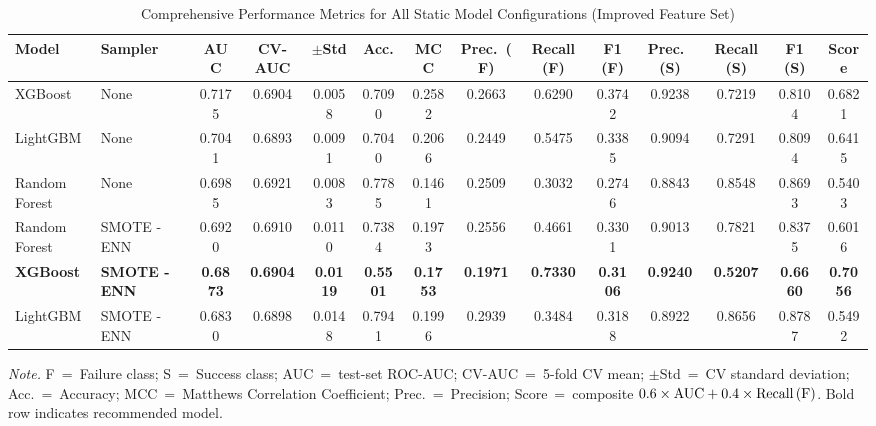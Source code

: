 \documentclass[12pt]{article}
\begin{document}
\begin{table}[htbp]
\caption{Comprehensive Performance Metrics for All Static Model Configurations (Improved Feature Set)}
\label{tab:model_comparison}
\begin{tabular}{llcccccccccccc}
\toprule
Model & Sampler & AUC & CV-AUC & $\pm$Std & Acc. & MCC & Prec.\ (F) & Recall (F) & F1 (F) & Prec.\ (S) & Recall (S) & F1 (S) & Score \\
\midrule
XGBoost & None & 0.7175 & 0.6904 & 0.0058 & 0.7090 & 0.2582 & 0.2663 & 0.6290 & 0.3742 & 0.9238 & 0.7219 & 0.8104 & 0.6821 \\
LightGBM & None & 0.7041 & 0.6893 & 0.0091 & 0.7040 & 0.2066 & 0.2449 & 0.5475 & 0.3385 & 0.9094 & 0.7291 & 0.8094 & 0.6415 \\
Random Forest & None & 0.6985 & 0.6921 & 0.0083 & 0.7785 & 0.1461 & 0.2509 & 0.3032 & 0.2746 & 0.8843 & 0.8548 & 0.8693 & 0.5403 \\
Random Forest & SMOTE - ENN & 0.6920 & 0.6910 & 0.0110 & 0.7384 & 0.1973 & 0.2556 & 0.4661 & 0.3301 & 0.9013 & 0.7821 & 0.8375 & 0.6016 \\
\textbf{XGBoost} & \textbf{SMOTE - ENN} & \textbf{0.6873} & \textbf{0.6904} & \textbf{0.0119} & \textbf{0.5501} & \textbf{0.1753} & \textbf{0.1971} & \textbf{0.7330} & \textbf{0.3106} & \textbf{0.9240} & \textbf{0.5207} & \textbf{0.6660} & \textbf{0.7056} \\
LightGBM & SMOTE - ENN & 0.6830 & 0.6898 & 0.0148 & 0.7941 & 0.1996 & 0.2939 & 0.3484 & 0.3188 & 0.8922 & 0.8656 & 0.8787 & 0.5492 \\
\bottomrule
\end{tabular}%
\smallskip

{\footnotesize \textit{Note.} F~=~Failure class; S~=~Success class; AUC~=~test-set ROC-AUC; CV-AUC~=~5-fold CV mean; $\pm$Std~=~CV standard deviation; Acc.~=~Accuracy; MCC~=~Matthews Correlation Coefficient; Prec.~=~Precision; Score~=~composite $0.6 \times \text{AUC} + 0.4 \times \text{Recall\,(F)}$. Bold row indicates recommended model.}
\end{table}
\end{document}
